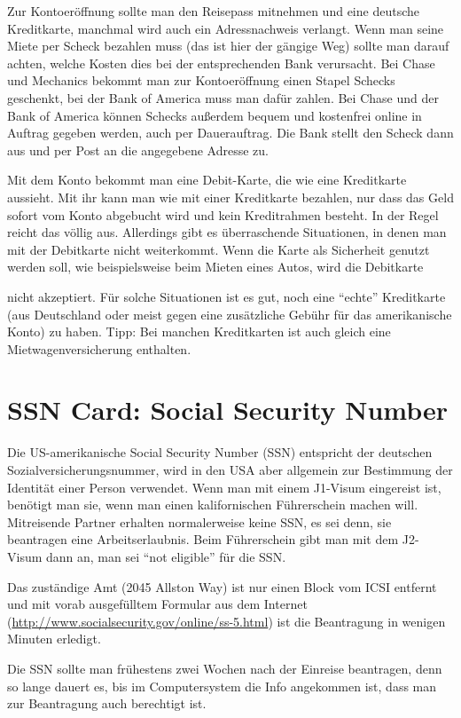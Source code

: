\documentclass[a4paper]{scrreprt}
\begin{document}
Zur Kontoeröffnung sollte man den Reisepass mitnehmen und eine deutsche Kreditkarte, manchmal wird auch ein Adressnachweis verlangt. Wenn man seine Miete per Scheck bezahlen muss (das ist hier der gängige Weg) sollte man darauf achten, welche Kosten dies bei der entsprechenden Bank verursacht. Bei Chase und Mechanics bekommt man zur Kontoeröffnung einen Stapel Schecks geschenkt, bei der Bank of America muss man dafür zahlen. Bei Chase und der Bank of America können Schecks außerdem bequem und kostenfrei online in Auftrag gegeben werden, auch per Dauerauftrag. Die Bank stellt den Scheck dann aus und per Post an die angegebene Adresse zu.

Mit dem Konto bekommt man eine Debit-Karte, die wie eine Kreditkarte aussieht. Mit ihr kann man wie mit einer Kreditkarte bezahlen, nur dass das Geld sofort vom Konto abgebucht wird und kein Kreditrahmen besteht. In der Regel reicht das völlig aus. Allerdings gibt es überraschende Situationen, in denen man mit der Debitkarte nicht weiterkommt. Wenn die Karte als Sicherheit genutzt werden soll, wie beispielsweise beim Mieten eines Autos, wird die Debitkarte
 
nicht akzeptiert. Für solche Situationen ist es gut, noch eine "`echte"' Kreditkarte (aus Deutschland oder meist gegen eine zusätzliche Gebühr für das amerikanische Konto) zu haben. Tipp: Bei manchen Kreditkarten ist auch gleich eine Mietwagenversicherung enthalten.


\section{SSN Card: Social Security Number}

Die US-amerikanische Social Security Number (SSN) entspricht der deutschen Sozialversicherungsnummer, wird in den USA aber allgemein zur Bestimmung der Identität einer Person verwendet. Wenn man mit einem J1-Visum eingereist ist, benötigt man sie, wenn man einen kalifornischen Führerschein machen will. Mitreisende Partner erhalten normalerweise keine SSN, es sei denn, sie beantragen eine Arbeitserlaubnis. Beim Führerschein gibt man mit dem J2- Visum dann an, man sei "`not eligible"' für die SSN.

Das zuständige Amt (2045 Allston Way) ist nur einen Block vom ICSI entfernt und mit vorab ausgefülltem Formular aus dem Internet (\url{http://www.socialsecurity.gov/online/ss-5.html}) ist die Beantragung in wenigen Minuten erledigt.

Die SSN sollte man frühestens zwei Wochen nach der Einreise beantragen, denn so lange dauert es, bis im Computersystem die Info angekommen ist, dass man zur Beantragung auch berechtigt ist.
\end{document}
